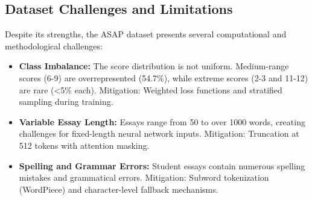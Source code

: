 ﻿\documentclass[12pt,a4paper]{article}
\begin{document}
\subsection{Dataset Challenges and Limitations}
Despite its strengths, the ASAP dataset presents several computational and methodological challenges:

\begin{itemize}
    \item \textbf{Class Imbalance:} The score distribution is not uniform. Medium-range scores (6-9) are overrepresented (54.7\%), while extreme scores (2-3 and 11-12) are rare (<5\% each). Mitigation: Weighted loss functions and stratified sampling during training.
    
    \item \textbf{Variable Essay Length:} Essays range from 50 to over 1000 words, creating challenges for fixed-length neural network inputs. Mitigation: Truncation at 512 tokens with attention masking.
    
    \item \textbf{Spelling and Grammar Errors:} Student essays contain numerous spelling mistakes and grammatical errors. Mitigation: Subword tokenization (WordPiece) and character-level fallback mechanisms.
\end{itemize}

\newpage
\end{document}
